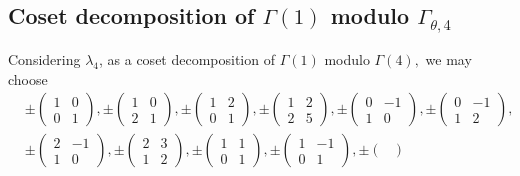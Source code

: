 \documentclass[12pt]{article}
\theoremstyle{definition}
\numberwithin{equation}{section}
\numberwithin{theorem}{section}
\begin{document}
\subsection{Coset decomposition of $\Gamma(1) $ modulo $\Gamma_{\theta,4}$ }
Considering $\lambda_4$, 
as a  coset decomposition of $\Gamma(1)$ modulo $\Gamma(4),$ 
we may choose 
\begin{align*}
&
\pm 
\begin{pmatrix}
1 & 0 \\
0 & 1
\end{pmatrix}, 
\pm 
\begin{pmatrix}
1 & 0 \\
2 & 1
\end{pmatrix}, 
\pm 
\begin{pmatrix}
1 & 2 \\
0 & 1
\end{pmatrix}, 
\pm 
\begin{pmatrix}
1 & 2 \\
2&5
\end{pmatrix}, 
\pm 
\begin{pmatrix}
0 & -1 \\
1 & 0
\end{pmatrix}, 
\pm 
\begin{pmatrix}
0 & -1 \\
1 & 2
\end{pmatrix},   \\
&
\pm 
\begin{pmatrix}
2 & -1 \\
1 & 0
\end{pmatrix}, 
\pm 
\begin{pmatrix}
2 & 3 \\
1 & 2
\end{pmatrix}, 
\pm 
\begin{pmatrix}
1 & 1 \\
0 & 1
\end{pmatrix}, 
\pm 
\begin{pmatrix}
1 & -1 \\
0 & 1
\end{pmatrix}, 
\pm 
\begin{pmatrix}

\end{pmatrix}
\end{align*}
\end{document}
